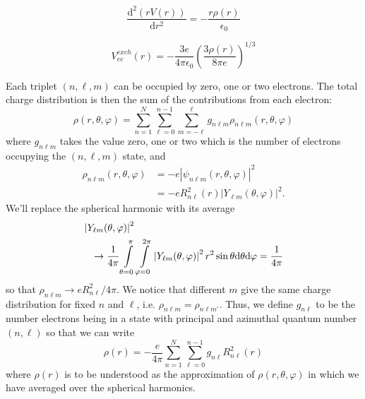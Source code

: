 \documentclass[twocolumn]{article}
\begin{document}
\begin{large}
\begin{equation}
    \label{30apr1122}
    \frac{\text{d}^2(rV(r))}{\text{d}r^2} = -\frac{r\rho(r)}{\epsilon_0}
\end{equation}

\begin{equation}
    \label{30apr1123}
    V_{ee}^{exch}(r) = -\frac{3e}{4\pi\epsilon_0}\left(\frac{3\rho(r)}{8\pi e}\right)^{1/3}
\end{equation}

Each triplet $(n,\ell,m)$ can be occupied by zero, one or two electrons. The total charge distribution is then the sum of the contributions from each electron:
\begin{equation}
    \rho(r,\theta,\varphi) = \sum_{n=1}^{N}\sum_{\ell=0}^{n-1}\sum_{m=-\ell}^{\ell}g_{n\ell m}\rho_{n\ell m}(r,\theta,\varphi)
\end{equation}
where $g_{n\ell m}$ takes the value zero, one or two which is the number of electrons occupying the $(n,\ell,m)$ state, and 
\begin{equation}
    \begin{split}
        \rho_{n\ell m}(r,\theta,\varphi) &= -e\left|\psi_{n\ell m}(r,\theta,\varphi)\right|^2 \\ 
        &= -eR^2_{n\ell}(r)\left|Y_{\ell m}(\theta,\varphi)\right|^2. 
    \end{split}
\end{equation}
We'll replace the spherical harmonic with its average
\begin{equation}
    \begin{split}
        &\left|Y_{\ell m}(\theta,\varphi)\right|^2 \\ 
        &\hspace{0.3cm}\to \frac{1}{4\pi}\int\limits_{\theta=0}^\pi\int\limits_{\varphi=0}^{2\pi}\left|Y_{\ell m}(\theta,\varphi)\right|^2r^2\sin\theta\text{d}\theta\text{d}\varphi = \frac{1}{4\pi}
    \end{split}
\end{equation}
so that $\rho_{n\ell m} \to eR^2_{n\ell}/4\pi$. We notice that different $m$ give the same charge distribution for fixed $n$ and $\ell$, i.e. $\rho_{n\ell m} = \rho_{n\ell m'}$. Thus, we define $g_{n\ell}$ to be the number electrons being in a state with principal and azimuthal quantum number $(n,\ell)$ so that we can write 
\begin{equation}
    \label{30apr1108}
    \rho(r) = -\frac{e}{4\pi}\sum_{n=1}^{N}\sum_{\ell=0}^{n-1}g_{n\ell}R^2_{n\ell}(r)
\end{equation}
where $\rho(r)$ is to be understood as the approximation of $\rho(r,\theta,\varphi)$ in which we have averaged over the spherical harmonics.


\end{large}
\end{document}
